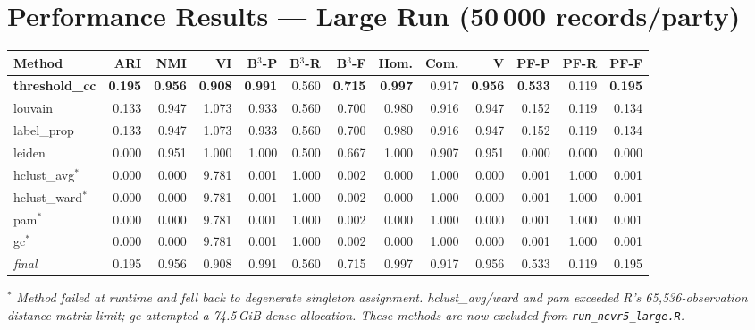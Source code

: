 \documentclass[11pt, a4paper]{article}
\begin{document}
\section{Performance Results --- Large Run (50\,000 records/party)}

\begin{table}[h!]
\centering
\small
\setlength{\tabcolsep}{4pt}
\begin{tabular}{lrrrrrrrrrrrr}
\toprule
\textbf{Method} & \textbf{ARI} & \textbf{NMI} & \textbf{VI} &
\textbf{B$^3$-P} & \textbf{B$^3$-R} & \textbf{B$^3$-F} &
\textbf{Hom.} & \textbf{Com.} & \textbf{V} &
\textbf{PF-P} & \textbf{PF-R} & \textbf{PF-F} \\
\midrule
\textbf{threshold\_cc} & \textbf{0.195} & \textbf{0.956} & \textbf{0.908} & \textbf{0.991} & 0.560 & \textbf{0.715} & \textbf{0.997} & 0.917 & \textbf{0.956} & \textbf{0.533} & 0.119 & \textbf{0.195} \\
louvain                & 0.133 & 0.947 & 1.073 & 0.933 & 0.560 & 0.700 & 0.980 & 0.916 & 0.947 & 0.152 & 0.119 & 0.134 \\
label\_prop            & 0.133 & 0.947 & 1.073 & 0.933 & 0.560 & 0.700 & 0.980 & 0.916 & 0.947 & 0.152 & 0.119 & 0.134 \\
leiden                 & 0.000 & 0.951 & 1.000 & 1.000 & 0.500 & 0.667 & 1.000 & 0.907 & 0.951 & 0.000 & 0.000 & 0.000 \\
hclust\_avg$^*$        & 0.000 & 0.000 & 9.781 & 0.001 & 1.000 & 0.002 & 0.000 & 1.000 & 0.000 & 0.001 & 1.000 & 0.001 \\
hclust\_ward$^*$       & 0.000 & 0.000 & 9.781 & 0.001 & 1.000 & 0.002 & 0.000 & 1.000 & 0.000 & 0.001 & 1.000 & 0.001 \\
pam$^*$                & 0.000 & 0.000 & 9.781 & 0.001 & 1.000 & 0.002 & 0.000 & 1.000 & 0.000 & 0.001 & 1.000 & 0.001 \\
gc$^*$                 & 0.000 & 0.000 & 9.781 & 0.001 & 1.000 & 0.002 & 0.000 & 1.000 & 0.000 & 0.001 & 1.000 & 0.001 \\
\midrule
\textit{final}         & 0.195 & 0.956 & 0.908 & 0.991 & 0.560 & 0.715 & 0.997 & 0.917 & 0.956 & 0.533 & 0.119 & 0.195 \\
\bottomrule
\end{tabular}
\end{table}

$^*$ \textit{Method failed at runtime and fell back to degenerate singleton assignment.
hclust\_avg/ward and pam exceeded R's 65,536-observation distance-matrix limit;
gc attempted a 74.5\,GiB dense allocation. These methods are now excluded from
\texttt{run\_ncvr5\_large.R}.}
\end{document}
